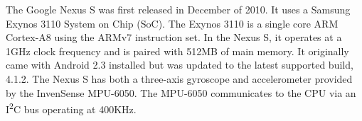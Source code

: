
The Google Nexus S was first released in December of 2010.  It uses a Samsung Exynos 3110 System on Chip (SoC).  The Exynos 3110 is a single core ARM Cortex-A8 using the ARMv7 instruction set.  In the Nexus S, it operates at a 1GHz clock frequency and is paired with 512MB of main memory.  It originally came with Android 2.3 installed but was updated to the latest supported build, 4.1.2.  The Nexus S has both a three-axis gyroscope and accelerometer provided by the InvenSense MPU-6050. The MPU-6050 communicates to the CPU via an I\textsuperscript{2}C bus operating at 400KHz. 


